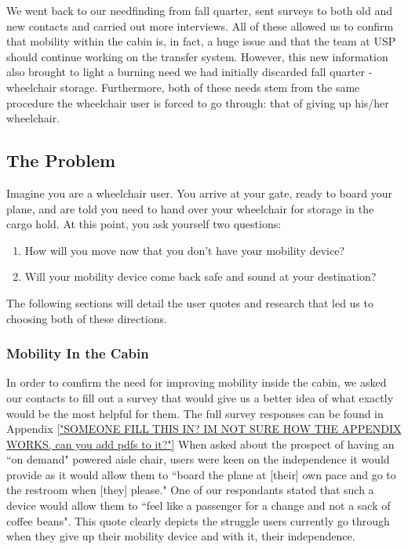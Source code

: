 We went back to our needfinding from fall quarter, sent surveys to both old and new contacts and carried out more interviews. All of these allowed us to confirm that mobility within the cabin is, in fact, a huge issue and that the team at USP should continue working on the transfer system. However, this new information also brought to light a burning need we had initially discarded fall quarter - wheelchair storage. Furthermore, both of these needs stem from the same procedure the wheelchair user is forced to go through: that of giving up his/her wheelchair. 

\subsection{The Problem}

Imagine you are a wheelchair user. You arrive at your gate, ready to board your plane, and are told you need to hand over your wheelchair for storage in the cargo hold. At this point, you ask yourself two questions: 
\begin{enumerate}
	\item How will you move now that you don't have your mobility device? 
	\item Will your mobility device come back safe and sound at your destination?
\end{enumerate}
The following sections will detail the user quotes and research that led us to choosing both of these directions.  
\\

\subsubsection*{Mobility In the Cabin}

In order to comfirm the need for improving mobility inside the cabin, we asked our contacts to fill out a survey that would give us a better idea of what exactly would be the most helpful for them. The full survey responses can be found in Appendix \ref{"SOMEONE FILL THIS IN? IM NOT SURE HOW THE APPENDIX WORKS, can you add pdfs to it?"} 
When asked about the prospect of having an ``on demand"  powered aisle chair, users were keen on the independence it would provide as it would allow them to ``board the plane at [their] own pace and go to the restroom when [they] please." One of our respondants stated that such a device would allow them to ``feel like a passenger for a change and not a sack of coffee beans". This quote clearly depicts the struggle users currently go through when they give up their mobility device and with it, their independence.

